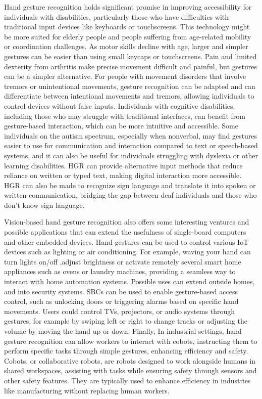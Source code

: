 \documentclass[12pt]{article}
\begin{document}
  Hand gesture recognition holds significant promise in improving accessibility for individuals with disabilities, particularly those who have difficulties with traditional input devices like keyboards or touchscreens.
  This technology might be more suited for elderly people and people suffering from age-related mobility or coordination challenges. As motor skills decline with age, larger and simpler gestures can be easier than using small keycaps or touchscreens.
  Pain and limited dexterity from arthritis make precise movement difficult and painful, but gestures can be a simpler alternative. For people with movement disorders that involve tremors or unintentional movements, gesture recognition can be adapted and can differentiate between intentional movements and tremors, allowing individuals to control devices without false inputs.
  Individuals with cognitive disabilities, including those who may struggle with traditional interfaces, can benefit from gesture-based interaction, which can be more intuitive and accessible. Some individuals on the autism spectrum, especially when nonverbal, may find gestures easier to use for communication and interaction compared to text or speech-based systems, and it can also be useful for individuals struggling with dyslexia or other learning disabilities. HGR can provide alternative input methods that reduce reliance on written or typed text, making digital interaction more accessible.
  HGR can also be made to recognize sign language and translate it into spoken or written communication, bridging the gap between deaf individuals and those who don’t know sign language.

  Vision-based hand gesture recognition also offers some interesting ventures and possible applications that can extend the usefulness of single-board computers and other embedded devices. Hand gestures can be used to control various IoT devices such as lighting or air conditioning. For example, waving your hand can turn lights on/off ,adjust brightness or activate remotely several smart home appliances such as ovens or laundry machines, providing a seamless way to interact with home automation systems. Possible uses can extend outside homes, and into security systems. SBCs can be used to enable gesture-based access control, such as unlocking doors or triggering alarms based on specific hand movements. Users could control TVs, projectors, or audio systems through gestures, for example by swiping left or right to change tracks or adjusting the volume by moving the hand up or down. Finally, In industrial settings, hand gesture recognition can allow workers to interact with cobots, instructing them to perform specific tasks through simple gestures, enhancing efficiency and safety. Cobots, or collaborative robots, are robots designed to work alongside humans in shared workspaces, assisting with tasks while ensuring safety through sensors and other safety features. They are typically used to enhance efficiency in industries like manufacturing without replacing human workers.
\end{document}

